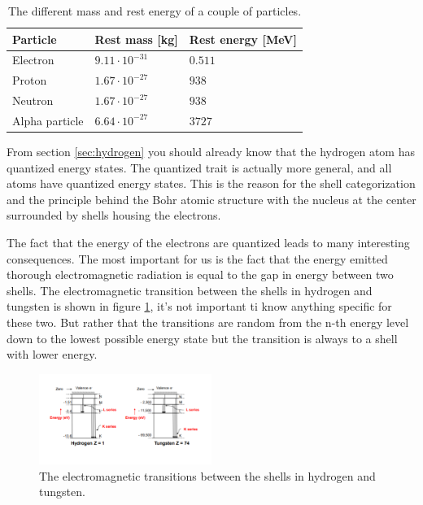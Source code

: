 \documentclass[jmp, amsmath, amssymb, reprint]{article}
\numberwithin{equation}{section}
\begin{document}
\begin{multicols}{2}
\begin{table}[H]
  \begin{center}
    \begin{tabular}{| l | l | l |}
   	\hline
	Particle & Rest mass [kg] & Rest energy [MeV]\\ \hline
	Electron & \(9.11\cdot10^{-31}\) & \(0.511\)\\
	Proton & \(1.67\cdot10^{-27}\) & \(938\)\\
	Neutron & \(1.67\cdot10^{-27}\) & \(938\)\\
	Alpha particle & \(6.64\cdot10^{-27}\) & \(3727\)\\ \hline
	\end{tabular}
    \caption{The different mass and rest energy of a couple of particles.}
    \label{tabel:3}
  \end{center}
\end{table}

From section \ref{sec:hydrogen} you should already know that the hydrogen atom has quantized energy states. The quantized trait is actually more general, and all atoms have quantized energy states. This is the reason for the shell categorization and the principle behind the Bohr atomic structure with the nucleus at the center surrounded by shells housing the electrons.

The fact that the energy of the electrons are quantized leads to many interesting consequences. The most important for us is the fact that the energy emitted thorough electromagnetic radiation is equal to the gap in energy between two shells. The electromagnetic transition between the shells in hydrogen and tungsten is shown in figure \ref{fig:el_transition}, it's not important ti know anything specific for these two. But rather that the transitions are random from the n-th energy level down to the lowest possible energy state but the transition is always to a shell with lower energy.

\begin{figure}[H]
	\centering
  	\includegraphics[width=0.50\textwidth]{electromagnetic_transistion.png}
	\caption{The electromagnetic transitions between the shells in hydrogen and tungsten.}
	\label{fig:el_transition}
\end{figure}


\end{multicols}
\end{document}

